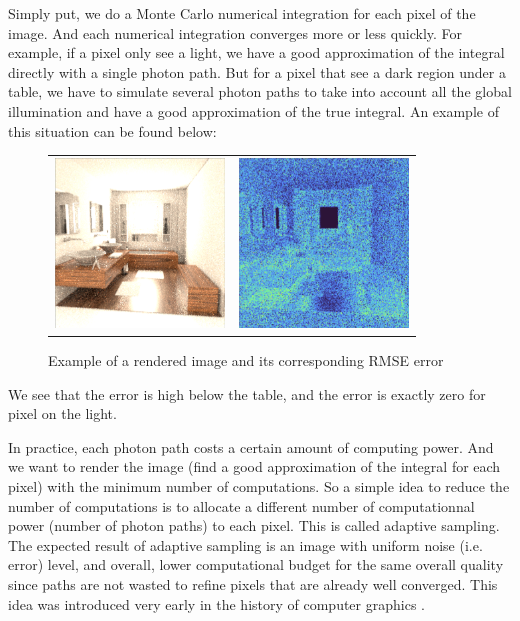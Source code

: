 \documentclass{classeENS}
\begin{document}
\par Simply put, we do a Monte Carlo numerical integration for each pixel 
of the image. And each numerical integration converges more or less quickly. 
For example, if a pixel only see a light, we have a good approximation 
of the integral directly with a single photon path. But for a pixel that see a dark 
region under a table, we have to simulate several photon paths to take into account
all the global illumination and have a good approximation of the true integral. An example
of this situation can be found below:

\begin{figure}[H]
    \centering
    \caption{Example of a rendered image and its corresponding RMSE error}
    \begin{tabular}{cc}
    \includegraphics[width=45mm]{image/initial_rendered.png}
    & \includegraphics[width=45mm]{image/initial_error.png}
    \end{tabular}
\end{figure}
We see that the error is high below the table, and the error is exactly zero for pixel on 
the light.

\par In practice, each photon path costs a certain amount of computing power. 
And we want to render the image (find a good approximation of the integral 
for each pixel) with the minimum number of computations. So a simple idea 
to reduce the number of computations is to allocate a different number 
of computationnal power (number of photon paths) to each pixel. This is called 
adaptive sampling. The expected result of adaptive sampling is an 
image with uniform noise (i.e. error) level, and overall, 
lower computational budget for the same overall quality 
since paths are not wasted to refine pixels that are 
already well converged. This idea was introduced very early in the 
history of computer graphics \cite{10.1145/325165.325179}. 
\end{document}
